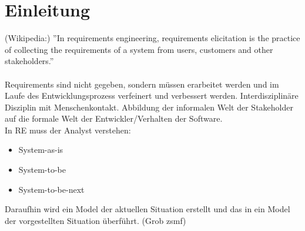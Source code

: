 \section{Einleitung}
(Wikipedia:) ''In requirements engineering, requirements elicitation is the practice of collecting the requirements of a system from users, customers and other stakeholders.''\\
\\
Requirements sind nicht gegeben, sondern müssen erarbeitet werden und im Laufe des Entwicklungsprozess verfeinert und verbessert werden.
Interdisziplinäre Disziplin mit Menschenkontakt. Abbildung der informalen Welt der Stakeholder auf die formale Welt der Entwickler/Verhalten der Software.\\
In RE muss der Analyst verstehen:
\begin{itemize}
	\item System-as-is
	\item System-to-be
	\item System-to-be-next
\end{itemize}
Daraufhin wird ein Model der aktuellen Situation erstellt und das in ein Model der vorgestellten Situation überführt. (Grob zsmf)
